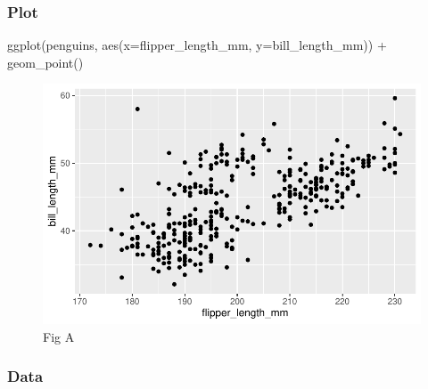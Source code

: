 \documentclass[
  letterpaper,
  DIV=11,
  numbers=noendperiod]{scrreprt}
\newenvironment{Shaded}{\begin{snugshade}}{\end{snugshade}}
\newcommand{\AttributeTok}[1]{\textcolor[rgb]{0.40,0.45,0.13}{#1}}
\newcommand{\FunctionTok}[1]{\textcolor[rgb]{0.28,0.35,0.67}{#1}}
\newcommand{\NormalTok}[1]{\textcolor[rgb]{0.00,0.23,0.31}{#1}}
\newcommand{\SpecialCharTok}[1]{\textcolor[rgb]{0.37,0.37,0.37}{#1}}
\begin{document}
\begin{tcolorbox}[enhanced jigsaw, colframe=quarto-callout-note-color-frame, breakable, colback=white, toprule=.15mm, leftrule=.75mm, left=2mm, opacityback=0, rightrule=.15mm, arc=.35mm, bottomrule=.15mm]

\hypertarget{plot}{%
\subsubsection*{Plot}\label{plot}}

\begin{Shaded}
\begin{Highlighting}[]
\FunctionTok{ggplot}\NormalTok{(penguins, }\FunctionTok{aes}\NormalTok{(}\AttributeTok{x=}\NormalTok{flipper\_length\_mm, }\AttributeTok{y=}\NormalTok{bill\_length\_mm)) }\SpecialCharTok{+}
  \FunctionTok{geom\_point}\NormalTok{()}
\end{Highlighting}
\end{Shaded}

\begin{figure}[H]

{\centering \includegraphics{03-content_files/figure-pdf/unnamed-chunk-4-1.pdf}

}

\caption{Fig A}

\end{figure}

\hypertarget{data}{%
\subsubsection*{Data}\label{data}}


\end{tcolorbox}
\end{document}
